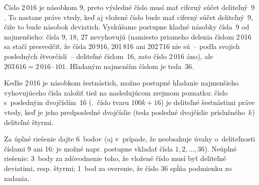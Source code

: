 {%
Číslo $2\,016$ je násobkom $9$, preto výsledné číslo musí mať
ciferný súčet deliteľný~$9$.
To nastane práve vtedy, keď aj vložené číslo bude mať ciferný súčet
deliteľný~$9$, čiže to bude násobok deviatich.
Vyskúšame postupne kladné násobky čísla~9 od najmenšieho:
čísla $9$, $18$, $27$ nevyhovujú (namiesto priameho delenia číslom 2\,016
sa stačí presvedčiť, že čísla 20\,916, 201\,816 ani
202\,716 nie sú~-- podľa svojich posledných štvorčíslí~-- deliteľné číslom~16,
zato číslo 2\,016 áno), ale $203\,616 = 2\,016 \cdot 101$.
Hľadaným najmenším číslom je teda~$36$.

\poznamka
Keďže 2\,016 je násobkom šestnástich, možno postupné hľadanie
najmenšieho vyhovujúceho čísla založiť tiež na nasledujúcom zrejmom poznatku:
číslo s~posledným dvojčíslím~16 (\tj.~číslo tvaru $100k+16$) je deliteľné
šestnástimi práve vtedy, keď je jeho predposledné dvojčíslie (teda posledné dvojčíslie
príslušného~$k$) deliteľné štyrmi.


\nobreak\medskip\petit\noindent
Za úplné riešenie dajte 6~bodov (aj v~prípade, že
neobsahuje úvahy o~deliteľnosti číslami 9 ani 16: je možné napr. postupne
vkladať čísla $1, 2, \dots, 36$).
Neúplné riešenie: 3~body za zdôvodnenie toho, že vložené číslo
musí byť deliteľné deviatimi, resp. štyrmi; 1~bod za overenie, že číslo $36$
spĺňa podmienku zo zadania.

\endpetit
\bigbreak
}


